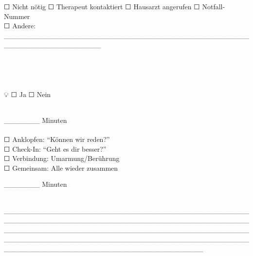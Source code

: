 ☐ Nicht nötig ☐ Therapeut kontaktiert ☐ Hausarzt angerufen ☐ Notfall-Nummer\\
☐ Andere: \_\_\_\_\_\_\_\_\_\_\_\_\_\_\_\_\_\_\_\_\_\_\_\_\_\_\_\_\_\_\_\_\_\_\_\_\_\_\_\_\_\_\_\_\_\_\_\_\_\_\_\_\_\_\_\_\_\_\_\_\_\_\_\_\_\_\_

\hfill\break
\hfill\break

\hypertarget{ruxfcckkehr-ritual}{%
\subsection[🔄 \ul{\textbf{\textcolor{ctmmBlue}{\1}}}]{\texorpdfstring{\protect\hypertarget{ruxfcckkehr-ritual}{}{}🔄 \ul{\textbf{\textcolor{ctmmBlue}{\1}}}}{🔄 RÜCKKEHR-RITUAL}}\label{ruxfcckkehr-ritual}}

\hypertarget{ruxfcckkehr-ritual-durchgefuxfchrt}{%
\subsubsection[\textbf{\textcolor{ctmmBlue}{\1}}]{\texorpdfstring{\protect\hypertarget{ruxfcckkehr-ritual-durchgefuxfchrt}{}{}\textbf{\textcolor{ctmmBlue}{\1}}}{Rückkehr-Ritual durchgeführt:}}\label{ruxfcckkehr-ritual-durchgefuxfchrt}}

💡 \textcolor{ctmmGreen}{\textit{\1}} \textcolor{ctmmGreen}{\textit{\1}} \textcolor{ctmmGreen}{\textit{\1}} \textcolor{ctmmGreen}{\textit{\1}} ☐ Ja ☐ Nein

\textbf{\textcolor{ctmmBlue}{\1}}\\
\textbf{\textcolor{ctmmBlue}{\1}} \_\_\_\_\_\_\_ Minuten\\
\textbf{\textcolor{ctmmBlue}{\1}}\\
☐ Anklopfen: ``Können wir reden?''\\
☐ Check-In: ``Geht es dir besser?''\\
☐ Verbindung: Umarmung/Berührung\\
☐ Gemeinsam: Alle wieder zusammen

\textbf{\textcolor{ctmmBlue}{\1}} \_\_\_\_\_\_\_ Minuten

\textbf{\textcolor{ctmmBlue}{\1}}\\
\_\_\_\_\_\_\_\_\_\_\_\_\_\_\_\_\_\_\_\_\_\_\_\_\_\_\_\_\_\_\_\_\_\_\_\_\_\_\_\_\_\_\_\_\_\_\_\_\_\_\_\_\_\_\_\_\_\_\_\_\_\_\_\_\_\_\_\_\_\_\_\_\_\_\_\_\_\_\_\_\_\_\_\_\_\_\_\_\_\_\_\_\_\_\_\_\_\_\_\_\_\_\_\_\_\_\_\_\_\_\_\_\_\_\_\_\_\_\_\_\_\_\_\_\_\_\_\_\_\_\_\_\_\_\_\_\_\_\_\_\_\_\_\_\_\_\_\_\_\_\_\_\_\_\_\_\_\_\_\_\_\_\_\_\_\_\_\_\_\_\_\_\_\_\_\_\_\_\_\_\_\_\_\_\_\_\_\_\_\_\_\_\_\_\_\_\_\_\_\_\_\_\_\_\_\_\_\_\_\_\_\_\_\_\_\_\_\_\_\_\_\_\_\_\_\_\_\_\_\_\_

